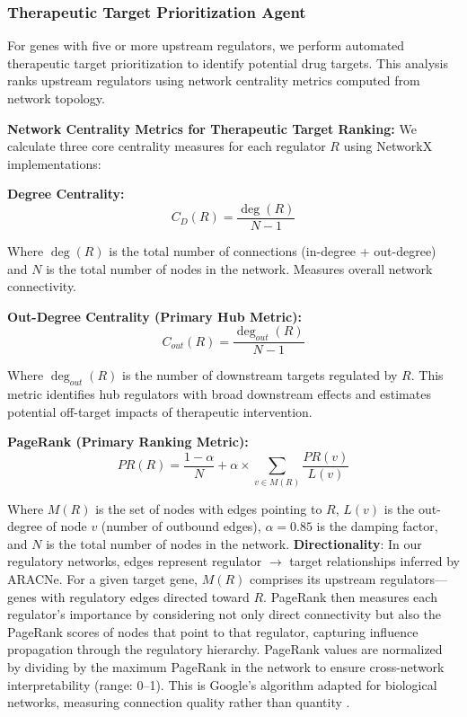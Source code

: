 \documentclass[11pt]{article}
\begin{document}
\subsubsection{Therapeutic Target Prioritization Agent}

For genes with five or more upstream regulators, we perform automated therapeutic target prioritization to identify potential drug targets. This analysis ranks upstream regulators using network centrality metrics computed from network topology.

\textbf{Network Centrality Metrics for Therapeutic Target Ranking:}
We calculate three core centrality measures for each regulator $R$ using NetworkX \cite{networkx2008} implementations:

\textbf{Degree Centrality:}
\begin{equation}
C_D(R) = \frac{\deg(R)}{N - 1}
\end{equation}

Where $\deg(R)$ is the total number of connections (in-degree + out-degree) and $N$ is the total number of nodes in the network. Measures overall network connectivity.

\textbf{Out-Degree Centrality (Primary Hub Metric):}
\begin{equation}
C_{out}(R) = \frac{\deg_{out}(R)}{N - 1}
\end{equation}

Where $\deg_{out}(R)$ is the number of downstream targets regulated by $R$. This metric identifies hub regulators with broad downstream effects and estimates potential off-target impacts of therapeutic intervention.

\textbf{PageRank (Primary Ranking Metric):}
\begin{equation}
PR(R) = \frac{1-\alpha}{N} + \alpha \times \sum_{v \in M(R)} \frac{PR(v)}{L(v)}
\end{equation}

Where $M(R)$ is the set of nodes with edges pointing to $R$, $L(v)$ is the out-degree of node $v$ (number of outbound edges), $\alpha = 0.85$ is the damping factor, and $N$ is the total number of nodes in the network. \textbf{Directionality}: In our regulatory networks, edges represent regulator $\rightarrow$ target relationships inferred by ARACNe. For a given target gene, $M(R)$ comprises its upstream regulators---genes with regulatory edges directed toward $R$. PageRank then measures each regulator's importance by considering not only direct connectivity but also the PageRank scores of nodes that point to that regulator, capturing influence propagation through the regulatory hierarchy. PageRank values are normalized by dividing by the maximum PageRank in the network to ensure cross-network interpretability (range: 0--1). This is Google's algorithm adapted for biological networks, measuring connection quality rather than quantity \cite{centrality2008}.
\end{document}
